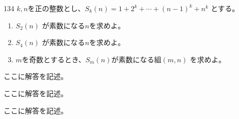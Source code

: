\begin{prob}{134}{}{}
 $k, n$を正の整数とし、$S_k(n)=1+2^k+\cdots+(n-1)^k+n^k$ とする。
 \begin{enumerate}
  \item $S_2(n)$ が素数になる$n$を求めよ。 
  \item $S_4(n)$ が素数になる$n$を求めよ。 
  \item $m$を奇数とするとき、$S_m(n)$が素数になる組$(m,n)$ を求めよ。 
 \end{enumerate}
\end{prob}
ここに解答を記述。

ここに解答を記述。

ここに解答を記述。